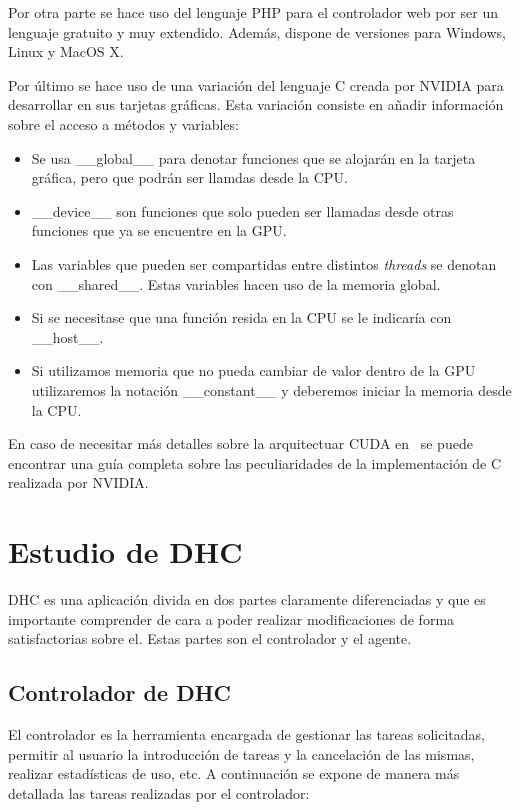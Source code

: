 Por otra parte se hace uso del lenguaje PHP para el controlador web por ser un lenguaje gratuito y muy extendido. Además, dispone de versiones para Windows, Linux y MacOS X.

Por último se hace uso de una variación del lenguaje C creada por NVIDIA para desarrollar en sus tarjetas gráficas. Esta variación consiste en añadir información sobre el acceso a métodos y variables:

\begin{itemize}
	\item Se usa \_\_global\_\_ para denotar funciones que se alojarán en la tarjeta gráfica, pero que podrán ser llamdas desde la CPU.

	\item \_\_device\_\_ son funciones que solo pueden ser llamadas desde otras funciones que ya se encuentre en la GPU.
	
	\item Las variables que pueden ser compartidas entre distintos \emph{threads} se denotan con \_\_shared\_\_. Estas variables hacen uso de la memoria global.
	
	\item Si se necesitase que una función resida en la CPU se le indicaría con \_\_host\_\_.
	
	\item Si utilizamos memoria que no pueda cambiar de valor dentro de la GPU utilizaremos la notación \_\_constant\_\_ y deberemos iniciar la memoria desde la CPU.
\end{itemize}

En caso de necesitar más detalles sobre la arquitectuar CUDA en~\cite{nvidia:cuda_c_programming_guide} se puede encontrar una guía completa sobre las peculiaridades de la implementación de C realizada por NVIDIA.

\section{Estudio de DHC}

DHC es una aplicación divida en dos partes claramente diferenciadas y que es importante comprender de cara a poder realizar modificaciones de forma satisfactorias sobre el. Estas partes son el controlador y el agente.

\subsection{Controlador de DHC}
El controlador es la herramienta encargada de gestionar las tareas solicitadas, permitir al usuario la introducción de tareas y la cancelación de las mismas, realizar estadísticas de uso, etc. A continuación se expone de manera más detallada las tareas realizadas por el controlador:

